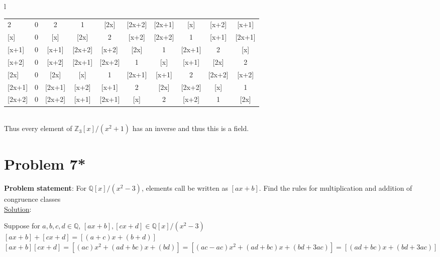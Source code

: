 \documentclass{article} %
\begin{document}
\begin{tabular}{l}
\begin{tabular}{l | c c c c c c c c c}
2                & 0            & 2             & 1            & [2x]         & [2x+2]    & [2x+1]   & [x]   & [x+2]     & [x+1] \\
{[}x]          & 0           & [x]          & [2x]         & 2             & [x+2]      & [2x+2]   & 1            & [x+1]          & [2x+1]            \\
{[}x+1]     & 0            & [x+1]      & [2x+2]   &[x+2]        & [2x]       & 1             & [2x+1]            & 2           & [x]           \\
{[}x+2]     &0             & [x+2]      & [2x+1]    &[2x+2]     & 1            & [x]           & [x+1]            & [2x]          & 2            \\
{[}2x]        & 0            & [2x]         & [x]          & 1              & [2x+1]  & [x+1]     & 2         & [2x+2]   & [x+2]     \\
{[}2x+1]   & 0            & [2x+1]     & [x+2]       & [x+1]     & 2           & [2x]        & [2x+2]     & [x]  & 1         \\
{[}2x+2]   &0             & [2x+2]    & [x+1]       & [2x+1]   & [x]           & 2             & [x+2]     & 1       & [2x]     \\
\end{tabular}  
\end{tabular}
\\Thus every element of $\mathbb{Z}_3[x]/(x^2+1)$ has an inverse and thus this is a field.
\newpage

\section*{Problem 7*}

\textbf{Problem statement}: For $\mathbb{Q}[x]/(x^2-3)$, elements call be written as $[ax+b]$.  Find the rules for multiplication and addition of congruence classes
\\

\underline{Solution}: 
\begin{addmargin}[1em]{0em}
Suppose for $a,b,c,d \in \mathbb{Q}$, $[ax + b], [cx + d] \in \mathbb{Q}[x]/(x^2 - 3)$
\\$[ax + b] + [cx + d] = [(a+c)x + (b+d)]$
\\$[ax+b][cx+d] = [(ac)x^2 + (ad + bc)x + (bd)] = [(ac - ac)x^2 + (ad + bc)x + (bd + 3ac)] = [(ad + bc)x + (bd + 3ac)]$
\end{addmargin}
\end{document}
